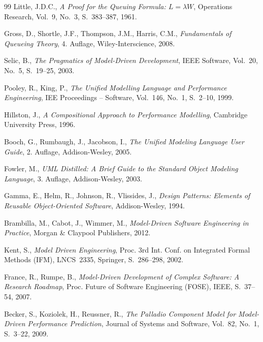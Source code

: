 ﻿\documentclass[a4paper,12pt]{scrreprt}
\theoremstyle{definition}
\begin{document}
\begin{thebibliography}{99}
	Little, J.D.C.,
	\textit{A Proof for the Queuing Formula: $L = \lambda W$},
	Operations Research, Vol.~9, No.~3, S.~383--387, 1961.
	
	Gross, D., Shortle, J.F., Thompson, J.M., Harris, C.M.,
	\textit{Fundamentals of Queueing Theory},
	4. Auflage, Wiley-Interscience, 2008.
	
	Selic, B.,
	\textit{The Pragmatics of Model-Driven Development},
	IEEE Software, Vol.~20, No.~5, S.~19--25, 2003.
	
	Pooley, R., King, P.,
	\textit{The Unified Modelling Language and Performance Engineering},
	IEE Proceedings -- Software, Vol.~146, No.~1, S.~2--10, 1999.
	
	Hillston, J.,
	\textit{A Compositional Approach to Performance Modelling},
	Cambridge University Press, 1996.
	
	Booch, G., Rumbaugh, J., Jacobson, I.,
	\textit{The Unified Modeling Language User Guide},
	2. Auflage, Addison-Wesley, 2005.
	
	Fowler, M.,
	\textit{UML Distilled: A Brief Guide to the Standard Object
		Modeling Language},
	3. Auflage, Addison-Wesley, 2003.
	
	Gamma, E., Helm, R., Johnson, R., Vlissides, J.,
	\textit{Design Patterns: Elements of Reusable Object-Oriented
		Software},
	Addison-Wesley, 1994.
	
	Brambilla, M., Cabot, J., Wimmer, M.,
	\textit{Model-Driven Software Engineering in Practice},
	Morgan \& Claypool Publishers, 2012.
	
	Kent, S.,
	\textit{Model Driven Engineering},
	Proc. 3rd Int. Conf. on Integrated Formal Methods (IFM),
	LNCS~2335, Springer, S.~286--298, 2002.
	
	France, R., Rumpe, B.,
	\textit{Model-Driven Development of Complex Software:
		A Research Roadmap},
	Proc. Future of Software Engineering (FOSE),
	IEEE, S.~37--54, 2007.
	
	Becker, S., Koziolek, H., Reussner, R.,
	\textit{The Palladio Component Model for Model-Driven Performance
		Prediction},
	Journal of Systems and Software, Vol.~82, No.~1, S.~3--22, 2009.
	

\end{thebibliography}
\end{document}

